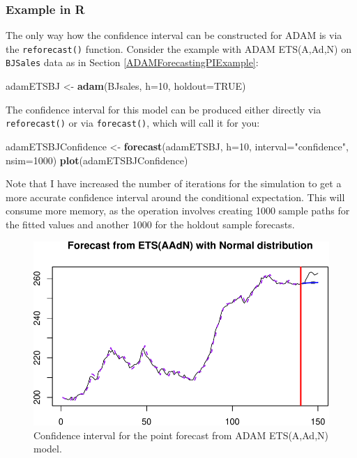 \documentclass[]{book}
\newenvironment{Shaded}{\begin{snugshade}}{\end{snugshade}}
\newcommand{\DataTypeTok}[1]{\textcolor[rgb]{0.13,0.29,0.53}{#1}}
\newcommand{\DecValTok}[1]{\textcolor[rgb]{0.00,0.00,0.81}{#1}}
\newcommand{\KeywordTok}[1]{\textcolor[rgb]{0.13,0.29,0.53}{\textbf{#1}}}
\newcommand{\NormalTok}[1]{#1}
\newcommand{\OtherTok}[1]{\textcolor[rgb]{0.56,0.35,0.01}{#1}}
\newcommand{\StringTok}[1]{\textcolor[rgb]{0.31,0.60,0.02}{#1}}
\theoremstyle{definition}
\theoremstyle{definition}
\theoremstyle{definition}
\theoremstyle{definition}
\theoremstyle{remark}
\begin{document}
\hypertarget{example-in-r-2}{%
\subsubsection{Example in R}\label{example-in-r-2}}

The only way how the confidence interval can be constructed for ADAM is via the \texttt{reforecast()} function. Consider the example with ADAM ETS(A,Ad,N) on \texttt{BJSales} data as in Section \ref{ADAMForecastingPIExample}:

\begin{Shaded}
\begin{Highlighting}[]
\NormalTok{adamETSBJ <-}\StringTok{ }\KeywordTok{adam}\NormalTok{(BJsales, }\DataTypeTok{h=}\DecValTok{10}\NormalTok{, }\DataTypeTok{holdout=}\OtherTok{TRUE}\NormalTok{)}
\end{Highlighting}
\end{Shaded}

The confidence interval for this model can be produced either directly via \texttt{reforecast()} or via \texttt{forecast()}, which will call it for you:

\begin{Shaded}
\begin{Highlighting}[]
\NormalTok{adamETSBJConfidence <-}\StringTok{ }\KeywordTok{forecast}\NormalTok{(adamETSBJ, }\DataTypeTok{h=}\DecValTok{10}\NormalTok{,}
                                \DataTypeTok{interval=}\StringTok{"confidence"}\NormalTok{, }\DataTypeTok{nsim=}\DecValTok{1000}\NormalTok{)}
\KeywordTok{plot}\NormalTok{(adamETSBJConfidence)}
\end{Highlighting}
\end{Shaded}

Note that I have increased the number of iterations for the simulation to get a more accurate confidence interval around the conditional expectation. This will consume more memory, as the operation involves creating 1000 sample paths for the fitted values and another 1000 for the holdout sample forecasts.

\begin{figure}
\centering
\includegraphics{Svetunkov--2022----ADAM_files/figure-latex/adamModelConfidence-1.pdf}
\caption{\label{fig:adamModelConfidence}Confidence interval for the point forecast from ADAM ETS(A,Ad,N) model.}
\end{figure}
\end{document}
